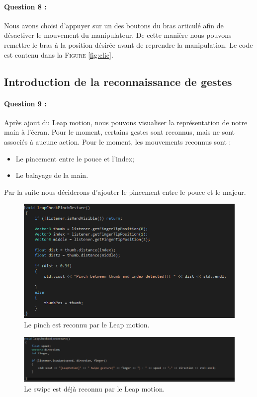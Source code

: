 \documentclass[a4paper,12pt]{article}
\begin{document}
\paragraph{Question 8 :} Nous avons choisi d'appuyer sur un des boutons du bras articulé afin de désactiver le mouvement du manipulateur. De cette manière nous pouvons remettre le bras à la position désirée avant de reprendre la manipulation. Le code est contenu dans la \textsc{Figure} \ref{fig:clic}.

\subsection{Introduction de la reconnaissance de gestes}
\paragraph{Question 9 :} Après ajout du Leap motion, nous pouvons visualiser la représentation de notre main à l'écran. Pour le moment, certains gestes sont reconnus, mais ne sont associés à aucune action. Pour le moment, les mouvements reconnus sont :
\begin{itemize}
  \item Le pincement entre le pouce et l'index;
  \item Le balayage de la main.
\end{itemize}

Par la suite nous déciderons d'ajouter le pincement entre le pouce et le majeur.
\begin{figure}[ht!]
  \centering
  \includegraphics[width=\textwidth]{images/gestes_base.png}
  \caption{Le pinch est reconnu par le Leap motion.}
  \label{fig:pinch}
\end{figure}
\begin{figure}[ht!]
  \centering
  \includegraphics[width=\textwidth, height=.2\textheight]{images/gestes_base2.png}
  \caption{Le swipe est déjà reconnu par le Leap motion.}
  \label{fig:swipe}
\end{figure}
\end{document}
